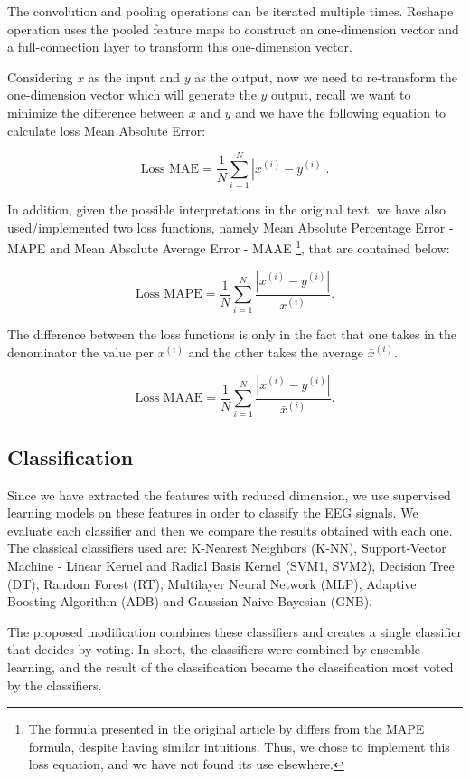 The convolution and pooling operations can be iterated multiple times. Reshape operation uses the pooled feature maps to construct an one-dimension vector and a full-connection layer to transform this one-dimension vector. 

Considering $x$ as the input and $y$ as the output, now we need to re-transform the one-dimension vector which will generate the $y$ output, recall we want to minimize the difference between $x$ and $y$ and we have the following equation to calculate loss Mean Absolute Error:

$$\text{Loss MAE}= \frac{1}{N} \sum_{i=1}^N |x^{(i)} - y^{(i)}| .$$


In addition, given the possible interpretations in the original text, we have also used/implemented two loss functions, namely Mean Absolute Percentage Error - MAPE and Mean Absolute Average Error - MAAE \footnote{The formula presented in the original article by \cite{WenZha:2018} differs from the MAPE formula, despite having similar intuitions. Thus, we chose to implement this loss equation, and we have not found its use elsewhere.}, that are contained below:


$$\text{Loss MAPE}= \frac{1}{N} \sum_{i=1}^N \frac{|x^{(i)} - y^{(i)}|}{x^{(i)}} .$$

The difference between the loss functions is only in the fact that one takes in the denominator the value per $x^{(i)}$ and the other takes the average ${\bar x^{(i)}}$.

$$\text{Loss MAAE}= \frac{1}{N} \sum_{i=1}^N \frac{|x^{(i)} - y^{(i)}|}{{\bar x^{(i)}}} .$$


\subsection{Classification}

Since we have extracted the features with reduced dimension, we use supervised learning models on these features in order to classify the EEG signals. We evaluate each classifier and then we compare the results obtained with each one. The classical classifiers used are: K-Nearest Neighbors (K-NN), Support-Vector Machine - Linear Kernel and Radial Basis Kernel (SVM1, SVM2), Decision Tree (DT), Random Forest (RT), Multilayer Neural Network (MLP), Adaptive Boosting Algorithm (ADB) and Gaussian Naive Bayesian (GNB).
 
The proposed modification combines these classifiers and creates a single classifier that decides by voting. In short, the classifiers were combined by ensemble learning, and the result of the classification became the classification most voted by the classifiers.


